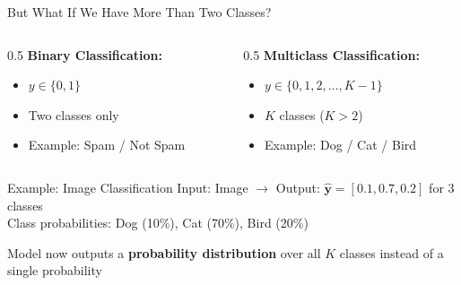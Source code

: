 \begin{frame}{But What If We Have More Than Two Classes?}
    \begin{columns}[c]
        \begin{column}{0.5\textwidth}
            \textbf{Binary Classification:}
            \begin{itemize}
                \item $y \in \{0, 1\}$
                \item Two classes only
                \item Example: Spam / Not Spam
            \end{itemize}
        \end{column}
        
        \begin{column}{0.5\textwidth}
            \textbf{Multiclass Classification:}
            \begin{itemize}
                \item $y \in \{0, 1, 2, \ldots, K-1\}$
                \item $K$ classes ($K > 2$)
                \item Example: Dog / Cat / Bird
            \end{itemize}
        \end{column}
    \end{columns}
    
    \vspace{1.5em}
    \begin{exampleblock}{Example: Image Classification}
        \centering
        Input: Image $\rightarrow$ Output: $\hat{\mathbf{y}} = [0.1, 0.7, 0.2]$ for 3 classes\\
        \small Class probabilities: Dog (10\%), Cat (70\%), Bird (20\%)
    \end{exampleblock}
    
    \vspace{1em}
    \begin{tcolorbox}[colback=green!5, colframe=green!60]
        Model now outputs a \textbf{probability distribution} over all $K$ classes instead of a single probability
    \end{tcolorbox}
\end{frame}

